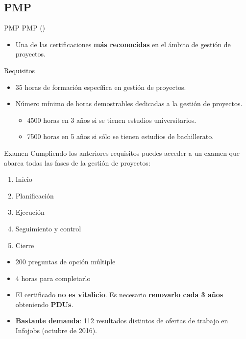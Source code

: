 \subsection{PMP}
\begin{frame}[allowframebreaks]{PMP}
	PMP ()
	\begin{itemize}
		\item Una de las certificaciones \textbf{más reconocidas} en el ámbito de gestión de proyectos.
	\end{itemize}
	
	\begin{block}{Requisitos}
		\begin{itemize}
			\item 35 horas de formación específica en gestión de proyectos.
			\item Número mínimo de horas demostrables dedicadas a la gestión de proyectos.
			\begin{itemize}
				\item 4500 horas en 3 años si se tienen estudios universitarios.
				\item 7500 horas en 5 años si sólo se tienen estudios de bachillerato.
			\end{itemize}
		\end{itemize}
	\end{block}
	
	\begin{block}{Examen}
		Cumpliendo los anteriores requisitos puedes acceder a un examen que abarca todas las fases de la gestión de proyectos:
		\begin{enumerate}
			\item Inicio
			\item Planificación
			\item Ejecución
			\item Seguimiento y control
			\item Cierre
		\end{enumerate}
		\begin{itemize}
			\item 200 preguntas de opción múltiple
			\item 4 horas para completarlo
		\end{itemize}
	\end{block}
	
	\framebreak
	
	\begin{itemize}
		\item El certificado \textbf{no es vitalicio}. Es necesario \textbf{renovarlo cada 3 años} obteniendo \textbf{PDUs}.
		
		\item \textbf{Bastante demanda}: 112 resultados distintos de ofertas de trabajo en Infojobs (octubre de 2016).
	\end{itemize}
\end{frame}

